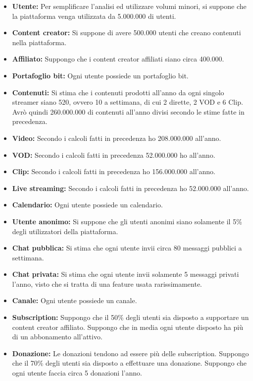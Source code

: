 \begin{itemize}
    \item \textbf{Utente:} Per semplificare l'analisi ed utilizzare volumi minori, si suppone che la piattaforma venga utilizzata da 5.000.000 di utenti.
    \item \textbf{Content creator:} Si suppone di avere 500.000 utenti che creano contenuti nella piattaforma.
    \item \textbf{Affiliato:} Suppongo che i content creator affiliati siano circa 400.000.
    \item \textbf{Portafoglio bit:} Ogni utente possiede un portafoglio bit.
    \item \textbf{Contenuti:} Si stima che i contenuti prodotti all'anno da ogni singolo streamer siano 520, ovvero 10 a settimana, di cui 2 dirette, 2 VOD e 6 Clip. Avrò quindi 260.000.000 di contenuti all'anno divisi secondo le stime fatte in precedenza.
    \item \textbf{Video:} Secondo i calcoli fatti in precedenza ho 208.000.000 all'anno.
    \item \textbf{VOD:} Secondo i calcoli fatti in precedenza 52.000.000 ho all'anno.
    \item \textbf{Clip:} Secondo i calcoli fatti in precedenza ho 156.000.000 all'anno.
    \item \textbf{Live streaming:} Secondo i calcoli fatti in precedenza ho 52.000.000 all'anno.
    \item \textbf{Calendario:} Ogni utente possiede un calendario.
    \item \textbf{Utente anonimo:} Si suppone che gli utenti anonimi siano solamente il 5\% degli utilizzatori della piattaforma.
    \item \textbf{Chat pubblica:} Si stima che ogni utente invii circa 80 messaggi pubblici a settimana.
    \item \textbf{Chat privata:} Si stima che ogni utente invii solamente 5 messaggi privati l'anno, visto che si tratta di una feature usata rarissimamente.
    \item \textbf{Canale:} Ogni utente possiede un canale.
    \item \textbf{Subscription:} Suppongo che il 50\% degli utenti sia disposto a supportare un content creator affiliato. Suppongo che in media ogni utente disposto ha più di un abbonamento all'attivo.
    \item \textbf{Donazione:} Le donazioni tendono ad essere più delle subscription. Suppongo che il 70\% degli utenti sia disposto a effettuare una donazione. Suppongo che ogni utente faccia circa 5 donazioni l'anno.

\end{itemize}
